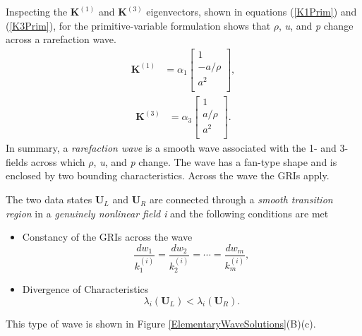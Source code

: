 \documentclass[]{article}
\begin{document}
			Inspecting the $ \textbf{K}^{(1)} $ and  $ \textbf{K}^{(3)} $ eigenvectors, shown in equations (\ref{K1Prim}) and (\ref{K3Prim}), for the primitive-variable formulation shows that $ \rho $, \textit{u}, and \textit{p} change across a rarefaction wave.
			\begin{align}
				\textbf{K}^{(1)} &= \alpha_1 \begin{bmatrix}
				1 \\
				-a/\rho \\
				a^2 \\
				\end{bmatrix},
				\label{K1Prim}
			\end{align}
			\begin{align}
				\textbf{K}^{(3)} &= \alpha_3 \begin{bmatrix}
				1 \\
				a/\rho \\
				a^2 \\
				\end{bmatrix}.
				\label{K3Prim}
			\end{align}
			In summary, a \textit{rarefaction wave} is a smooth wave associated with the 1- and 3-fields across which $ \rho $, \textit{u}, and \textit{p} change. The wave has a fan-type shape and is enclosed by two bounding characteristics. Across the wave the GRIs apply.
		
			The two data states $ \textbf{U}_L $ and $ \textbf{U}_R $ are connected through a \textit{smooth transition region} in a \textit{genuinely nonlinear field i} and the following conditions are met
			\begin{itemize}
				\item Constancy of the GRIs across the wave
				\begin{equation}
				\frac{dw_1}{k_1^{(i)}} = \frac{dw_2}{k_2^{(i)}} = \cdots = \frac{dw_m}{k_m^{(i)}},
				\end{equation}
				\item Divergence of Characteristics
				\begin{equation}
				\lambda_i(\textbf{U}_L) <  \lambda_i(\textbf{U}_R).
				\end{equation}
			\end{itemize}
			This type of wave is shown in Figure \ref{ElementaryWaveSolutions}(B)(c).
		
\end{document}
